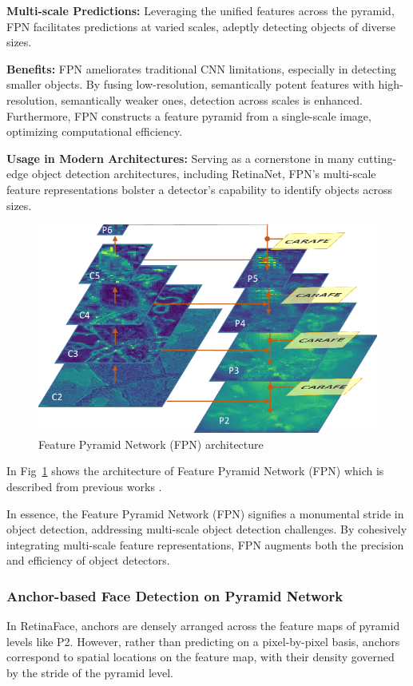 \documentclass{article}
\begin{document}
\textbf{Multi-scale Predictions:} Leveraging the unified features across the pyramid, FPN facilitates predictions at varied scales, adeptly detecting objects of diverse sizes.

\textbf{Benefits:} FPN ameliorates traditional CNN limitations, especially in detecting smaller objects. By fusing low-resolution, semantically potent features with high-resolution, semantically weaker ones, detection across scales is enhanced. Furthermore, FPN constructs a feature pyramid from a single-scale image, optimizing computational efficiency.

\textbf{Usage in Modern Architectures:} Serving as a cornerstone in many cutting-edge object detection architectures, including RetinaNet, FPN's multi-scale feature representations bolster a detector's capability to identify objects across sizes.


\begin{figure}[h]
  \centering
  \includegraphics[width=0.7\linewidth]{images/fpn}
  \caption{Feature Pyramid Network (FPN) architecture}
  \label{fig:fpn}
\end{figure}

In Fig~\ref{fig:fpn} shows the architecture of Feature Pyramid Network (FPN) which is described from previous works \cite{wang2019carafe}.

In essence, the Feature Pyramid Network (FPN) signifies a monumental stride in object detection, addressing multi-scale object detection challenges. By cohesively integrating multi-scale feature representations, FPN augments both the precision and efficiency of object detectors.


\subsubsection{Anchor-based Face Detection on Pyramid Network}

In RetinaFace, anchors are densely arranged across the feature maps of pyramid levels like P2. However, rather than predicting on a pixel-by-pixel basis, anchors correspond to spatial locations on the feature map, with their density governed by the stride of the pyramid level.
\end{document}
